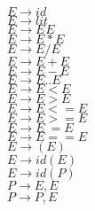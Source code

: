 \noindent
$ E \rightarrow id $ \\
$ E \rightarrow	lit $ \\
$ E \rightarrow E ^{} E $ \\
$ E \rightarrow	E * E $ \\
$ E \rightarrow	E / E $ \\
$ E \rightarrow E + E $ \\
$ E \rightarrow	E - E $ \\
$ E \rightarrow	E .. E $ \\
$ E \rightarrow	E < E $ \\
$ E \rightarrow	E > E $ \\
$ E \rightarrow	E <= E $ \\
$ E \rightarrow	E >= E $ \\
$ E \rightarrow	E ~= E $ \\
$ E \rightarrow	E == E $ \\
$ E \rightarrow	( E ) $ \\
$ E \rightarrow	id ( E ) $ \\
$ E \rightarrow	id ( P ) $ \\
$ P \rightarrow E, E $ \\
$ P \rightarrow	P, E $ \\
